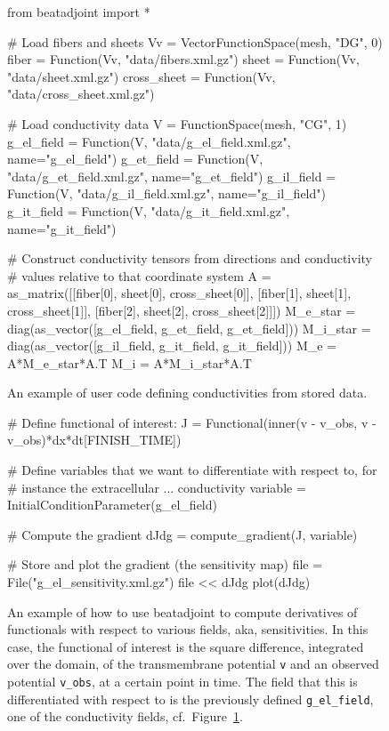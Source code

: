 \documentclass[a4paper, reqno]{amsart}
\numberwithin{equation}{section}
\begin{document}
\begin{figure}
  \begin{python}
from beatadjoint import *

# Load fibers and sheets
Vv = VectorFunctionSpace(mesh, "DG", 0)
fiber = Function(Vv, "data/fibers.xml.gz")
sheet = Function(Vv, "data/sheet.xml.gz")
cross_sheet = Function(Vv, "data/cross_sheet.xml.gz")

# Load conductivity data
V = FunctionSpace(mesh, "CG", 1)
g_el_field = Function(V, "data/g_el_field.xml.gz", name="g_el_field")
g_et_field = Function(V, "data/g_et_field.xml.gz", name="g_et_field")
g_il_field = Function(V, "data/g_il_field.xml.gz", name="g_il_field")
g_it_field = Function(V, "data/g_it_field.xml.gz", name="g_it_field")

# Construct conductivity tensors from directions and conductivity
# values relative to that coordinate system
A = as_matrix([[fiber[0], sheet[0], cross_sheet[0]],
               [fiber[1], sheet[1], cross_sheet[1]],
               [fiber[2], sheet[2], cross_sheet[2]]])
M_e_star = diag(as_vector([g_el_field, g_et_field, g_et_field]))
M_i_star = diag(as_vector([g_il_field, g_it_field, g_it_field]))
M_e = A*M_e_star*A.T
M_i = A*M_i_star*A.T

  \end{python}
\caption{An example of user code defining conductivities from stored
  data.}
\label{fig:user-code-conductivities}
\end{figure}

\begin{figure}
  \begin{python}
# Define functional of interest:
J = Functional(inner(v - v_obs, v - v_obs)*dx*dt[FINISH_TIME])

# Define variables that we want to differentiate with respect to, for
# instance the extracellular ... conductivity
variable = InitialConditionParameter(g_el_field)

# Compute the gradient
dJdg = compute_gradient(J, variable)

# Store and plot the gradient (the sensitivity map)
file = File("g_el_sensitivity.xml.gz")
file << dJdg
plot(dJdg)
  \end{python}
\caption{An example of how to use beatadjoint to compute derivatives
  of functionals with respect to various fields, aka,
  sensitivities. In this case, the functional of interest is the
  square difference, integrated over the domain, of the transmembrane
  potential \texttt{v} and an observed potential \texttt{v\_obs}, at a
  certain point in time. The field that this is differentiated with
  respect to is the previously defined \texttt{g\_el\_field}, one of
  the conductivity fields,
  cf.~Figure~\ref{fig:user-code-conductivities}.}
\label{fig:user-code-adjoint}
\end{figure}
\end{document}
